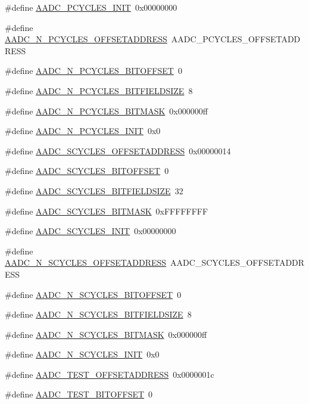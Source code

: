\begin{DoxyCompactItemize}
\#define \hyperlink{a00543_a7ad9a514311c815631b502864aa24075}{AADC\_\-PCYCLES\_\-INIT}~0x00000000
\item 
\#define \hyperlink{a00543_aedaa270127c40a0b3690ec0b1dd8808c}{AADC\_\-N\_\-PCYCLES\_\-OFFSETADDRESS}~AADC\_\-PCYCLES\_\-OFFSETADDRESS
\item 
\#define \hyperlink{a00543_a6a83c815b5bd66c0db33128e15a0ea2d}{AADC\_\-N\_\-PCYCLES\_\-BITOFFSET}~0
\item 
\#define \hyperlink{a00543_ad0320a2b793a1c764f74dbce4b8de1f9}{AADC\_\-N\_\-PCYCLES\_\-BITFIELDSIZE}~8
\item 
\#define \hyperlink{a00543_a1c986a6dbe9933181ba65a4f96c2f4b6}{AADC\_\-N\_\-PCYCLES\_\-BITMASK}~0x000000ff
\item 
\#define \hyperlink{a00543_a0c17ebb8fafbc8c6c165437ac040c97e}{AADC\_\-N\_\-PCYCLES\_\-INIT}~0x0
\item 
\#define \hyperlink{a00543_a8993204e9cf1690042e5a459e4cf6a65}{AADC\_\-SCYCLES\_\-OFFSETADDRESS}~0x00000014
\item 
\#define \hyperlink{a00543_a0497402184a85d9460ecddc74e561656}{AADC\_\-SCYCLES\_\-BITOFFSET}~0
\item 
\#define \hyperlink{a00543_a11d22b48b25665d58c2f0662ae8c0fa9}{AADC\_\-SCYCLES\_\-BITFIELDSIZE}~32
\item 
\#define \hyperlink{a00543_a4c05401977e753714a8240d7f262d7ff}{AADC\_\-SCYCLES\_\-BITMASK}~0xFFFFFFFF
\item 
\#define \hyperlink{a00543_af2fc78ab0b38d1b0fb347374d3443dab}{AADC\_\-SCYCLES\_\-INIT}~0x00000000
\item 
\#define \hyperlink{a00543_a1774aab3fd7789a5cd05e16a8fbf9e57}{AADC\_\-N\_\-SCYCLES\_\-OFFSETADDRESS}~AADC\_\-SCYCLES\_\-OFFSETADDRESS
\item 
\#define \hyperlink{a00543_af624086c069d1481c48529334d8141b5}{AADC\_\-N\_\-SCYCLES\_\-BITOFFSET}~0
\item 
\#define \hyperlink{a00543_a212c6bd7a9be0bba048c165cca61844c}{AADC\_\-N\_\-SCYCLES\_\-BITFIELDSIZE}~8
\item 
\#define \hyperlink{a00543_a729ce31547e8f9d98e7463ff87475076}{AADC\_\-N\_\-SCYCLES\_\-BITMASK}~0x000000ff
\item 
\#define \hyperlink{a00543_a2bddacb31e68fa2482ef8b0bf20a129f}{AADC\_\-N\_\-SCYCLES\_\-INIT}~0x0
\item 
\#define \hyperlink{a00543_ab01af92d5b0aa9a67c24d9fcaa313a17}{AADC\_\-TEST\_\-OFFSETADDRESS}~0x0000001c
\item 
\#define \hyperlink{a00543_acdd7abeac7fc55820674820bfadaace4}{AADC\_\-TEST\_\-BITOFFSET}~0

\end{DoxyCompactItemize}
